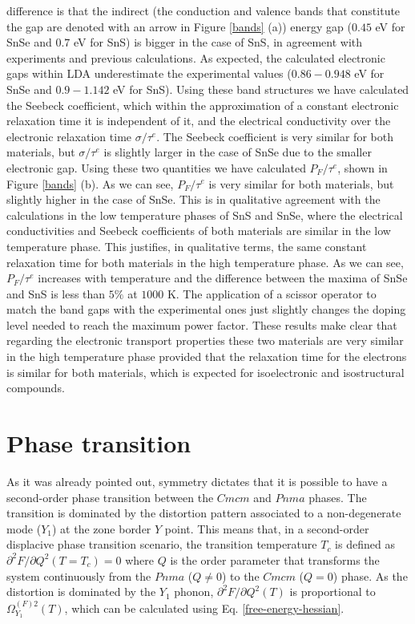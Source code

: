 difference is that the indirect (the conduction and valence bands that constitute the gap are denoted with an arrow in Figure \ref{bands} (a)) energy gap ($0.45$ eV for SnSe and $0.7$ eV for SnS) is bigger in the case of SnS, in
agreement with experiments\cite{vidal2012band,zhao2014ultralow} and previous calculations\cite{guo2015first}. As expected, the calculated electronic gaps within LDA underestimate the experimental values ($0.86-0.948$ eV for SnSe
and $0.9-1.142$ eV for SnS). Using these band structures we have calculated the Seebeck coefficient, which within the approximation of a constant electronic relaxation time it is independent of it, and the electrical conductivity 
over the electronic relaxation time $\sigma/\tau^{e}$. The Seebeck coefficient is very similar for both materials, but $\sigma/\tau^{e}$ is slightly larger in the case of SnSe due to the smaller electronic gap. Using these two
quantities we have calculated  $P_{F}/\tau^{e}$, shown in Figure \ref{bands} (b). As we can see, $P_{F}/\tau^{e}$ is very similar for both materials, but slightly higher in the case of SnSe.
This is in qualitative agreement with the calculations in the low temperature phases of SnS and SnSe\cite{guo2015first}, where the electrical conductivities and Seebeck coefficients of both materials are similar
in the low temperature phase. This justifies, in qualitative terms, the same constant relaxation time for both materials in the high temperature phase. As we can see,  $P_{F}/\tau^{e}$ increases with temperature and the
difference between the maxima of SnSe and SnS is less than $5\%$ at $1000$ K. The application of a scissor operator to match the band gaps with the experimental ones just slightly changes the doping level needed to reach the
maximum power factor.
These results make clear that regarding the electronic transport properties these two materials are very similar in the high temperature phase provided that the relaxation time for the electrons is similar for both
materials, which is expected for isoelectronic and isostructural compounds.

\section{Phase transition}

As it was already pointed out\cite{chattopadhyay1986neutron,aseginolaza2019phonon}, symmetry\cite{orobengoa2009amplimodes,perez2010mode} dictates that it is possible to have a second-order phase transition between
the $Cmcm$ and $Pnma$ phases. The transition is dominated by the distortion pattern associated to a non-degenerate mode ($Y_{1}$) at the zone border $Y$ point. This means\cite{aseginolaza2019phonon} that, in a second-order
displacive phase transition scenario, the transition temperature $T_{c}$ is defined as $\partial^{2}F/\partial Q^{2}(T=T_{c})=0$ where $Q$ is the order parameter that transforms the system continuously from the $Pnma$ ($Q\ne0$) to
the $Cmcm$ ($Q=0$) phase. As the distortion is dominated by the $Y_{1}$ phonon,  $\partial^{2}F/\partial Q^{2}(T)$ is proportional to $\Omega^{(F)2}_{Y_{1}}(T)$, which can be calculated using Eq. \ref{free-energy-hessian}. \\

